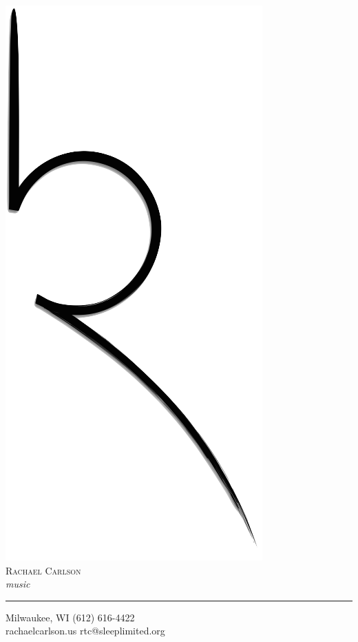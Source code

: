 \documentclass[11pt,a4paper]{memoir}
\begin{document}
\begin{center}
\vspace*{1mm}
\includegraphics[scale=0.025]{logo}\\
\textsc{\huge{Rachael Carlson}}\\
\emph{\tiny{music}}
\vspace*{5mm}
\hrule
\vfill
\tiny{Milwaukee, WI \hfill (612) 616-4422} \\ 
\tiny{rachaelcarlson.us} \hfill \tiny{rtc@sleeplimited.org} %
\end{center}
\end{document}
